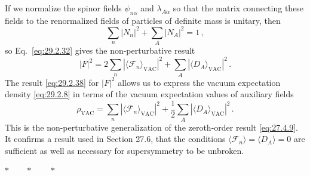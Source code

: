 If we normalize the spinor fields \(\psi_{n\alpha}\) and
\(\lambda_{A\alpha}\) so that
the matrix connecting these fields to the renormalized fields of particles
of definite mass is unitary, then
\begin{equation}
  \sum_n\lvert N_n\rvert^2+\sum_A\lvert N_A\rvert^2=1\,,
  \tag{29.2.37}\label{eq:29.2.37}
\end{equation}
so Eq.~\eqref{eq:29.2.32} gives the non-perturbative result
\begin{equation}
  \lvert F\rvert^2
  =
  2\sum_n
  \left\lvert\langle\mathcal{F}_n\rangle_{\mathrm{VAC}}\right\rvert^2
  +\sum_A
  \left\lvert\langle D_A\rangle_{\mathrm{VAC}}\right\rvert^2\,.
  \tag{29.2.38}\label{eq:29.2.38}
\end{equation}
The result \eqref{eq:29.2.38} for \(\lvert F\rvert^2\) allows us to
express the vacuum expectation density \eqref{eq:29.2.8} in terms of the
vacuum expectation values of auxiliary fields
\begin{equation}
  \rho_{\mathrm{VAC}}
  =
  \sum_n
  \left\lvert\langle\mathcal{F}_n\rangle_{\mathrm{VAC}}\right\rvert^2
  +\frac12\sum_A
  \left\lvert\langle D_A\rangle_{\mathrm{VAC}}\right\rvert^2\,.
  \tag{29.2.39}\label{eq:29.2.39}
\end{equation}
This is the non-perturbative generalization of the zeroth-order result
\eqref{eq:27.4.9}. It confirms a result used in Section 27.6, that the
conditions \(\langle\mathcal{F}_n\rangle=\langle D_A\rangle=0\) are
sufficient as well as necessary for supersymmetry to be unbroken.

\begin{center}
\(\ast\qquad\ast\qquad\ast\)
\end{center}

